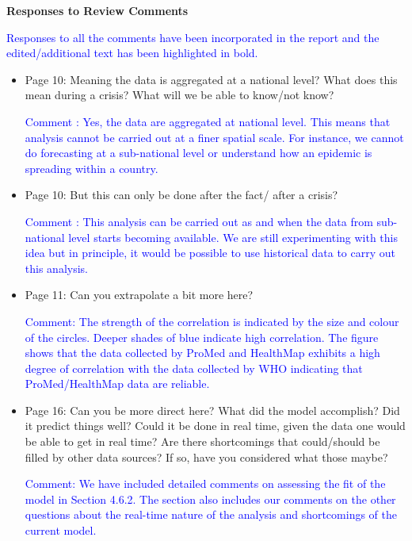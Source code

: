 \documentclass[a4paper,12pt]{article}
\def\sb#1{\textcolor{blue}{#1}}
\begin{document}
\begin{center}
 \textbf{\large Responses to Review Comments}
\end{center}

\sb{Responses to all the comments have been incorporated in the report and the
edited/additional text has been highlighted in bold.}

\begin{itemize}
\item[] Page 10: Meaning the data is aggregated at a national level? What does this mean during a crisis? What will we be able to know/not know?
 

\sb{Comment : Yes, the data are aggregated at national level. This means that analysis cannot be carried out at a finer spatial scale. For instance, we cannot do forecasting at a sub-national level or understand how an epidemic is spreading within a country.}
 

\item[] Page 10: But this can only be done after the fact/ after a crisis?

\sb{Comment : This analysis can be carried out as and when the data from sub-national level starts becoming available. We are still experimenting with this idea but in principle, it would be possible to use historical data to carry out this analysis.}
 

\item[] Page 11: Can you extrapolate a bit more here? 

\sb{Comment: The strength of the correlation is indicated by the size and colour of the circles. Deeper shades of blue indicate high correlation. The figure shows that the data collected by ProMed and HealthMap exhibits a high degree of correlation with the data collected by WHO indicating that ProMed/HealthMap data are reliable.}
 

\item[] Page 16: Can you be more direct here? What did the model accomplish?
Did it predict things well? Could it be done in real time, given the
data one would be able to get in real time? Are there shortcomings that could/should be filled by other data sources? If so, have you considered what those maybe?
 
\sb{Comment: We have included detailed comments on assessing the fit of
the model in Section 4.6.2. The section also includes our comments on
the other questions about the real-time nature of the analysis and
shortcomings of the current model.}
\end{itemize}
\end{document}
